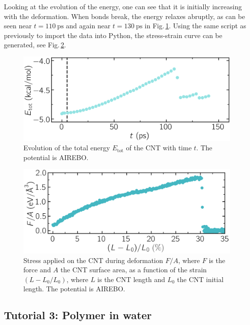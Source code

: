 \documentclass[9pt,tutorial]{livecoms}
\begin{document}
Looking at the evolution of the energy, one can see that it is initially
increasing with the deformation. When bonds break, the energy relaxes abruptly,
as can be seen near $t=110~\text{ps}$ and again near $t=130~\text{ps}$ in
Fig.\,\ref{fig:CNT-breakable-energy}. Using the same script as previously to
import the data into Python, the stress-strain
curve can be generated, see Fig.\,\ref{fig:CNT-stress-strain-breakable}.

\begin{figure}
\centering
\includegraphics[width=\linewidth]{CNT-energy-breakable}
\caption{Evolution of the total energy $E_\text{tot}$ of the CNT with time $t$.
The potential is AIREBO.}
\label{fig:CNT-breakable-energy}
\end{figure}

\begin{figure}
    \centering
    \includegraphics[width=\linewidth]{CNT-stress-strain-breakable}
    \caption{Stress applied on the CNT during deformation $F/A$, where $F$ is the force
    and $A$ the CNT surface area, as a function of the strain $(L-L_0/L_0)$, where
    $L$ is the CNT length and $L_0$ the CNT initial length. The potential is AIREBO.}
    \label{fig:CNT-stress-strain-breakable}
    \end{figure}

\subsection{Tutorial 3: Polymer in water}
\label{all-atoms-label}
\end{document}
